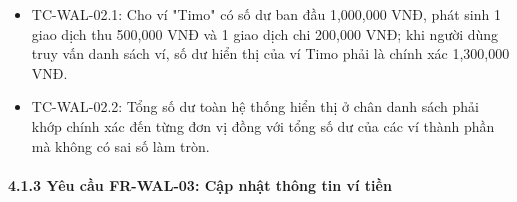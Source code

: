 \documentclass[11pt,a4paper]{article}
\providecommand{\tightlist}{
  \setlength{\itemsep}{0pt}\setlength{\parskip}{0pt}}
\begin{document}
\begin{itemize}
  \begin{itemize}
  \tightlist
  \item
    TC-WAL-02.1: Cho ví "Timo" có số dư ban đầu 1,000,000 VNĐ, phát sinh
    1 giao dịch thu 500,000 VNĐ và 1 giao dịch chi 200,000 VNĐ; khi
    người dùng truy vấn danh sách ví, số dư hiển thị của ví Timo phải là
    chính xác 1,300,000 VNĐ.
  \item
    TC-WAL-02.2: Tổng số dư toàn hệ thống hiển thị ở chân danh sách phải
    khớp chính xác đến từng đơn vị đồng với tổng số dư của các ví thành
    phần mà không có sai số làm tròn.
  \end{itemize}
\end{itemize}

\newpage

\paragraph{4.1.3 Yêu cầu FR-WAL-03: Cập nhật thông tin ví
tiền}\label{413-yuxeau-cux1ea7u-fr-wal-03-cux1eadp-nhux1eadt-thuxf4ng-tin-vuxed-tiux1ec1n}
\end{document}
